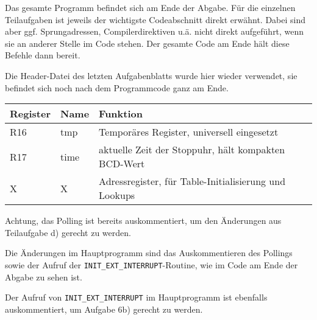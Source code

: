 \documentclass{CInf_practice}
\begin{document}
\cinftitle

Das gesamte Programm befindet sich am Ende der Abgabe.
Für die einzelnen Teilaufgaben ist jeweils der wichtigste Codeabschnitt
direkt erwähnt. Dabei sind aber ggf. Sprungadressen, Compilerdirektiven u.ä.
nicht direkt aufgeführt, wenn sie an anderer Stelle im Code stehen. Der gesamte
Code am Ende hält diese Befehle dann bereit.

Die Header-Datei des letzten Aufgabenblatts wurde hier wieder verwendet, sie 
befindet sich noch nach dem Programmcode ganz am Ende.



\begin{tabular}{l|l|l}
\bf Register & \bf Name & \bf Funktion \\\hline
R16 & tmp & Temporäres Register, universell eingesetzt \\
R17 & time & aktuelle Zeit der Stoppuhr, hält kompakten BCD-Wert \\
X & X & Adressregister, für Table-Initialisierung und Lookups
\end{tabular}











Achtung, das Polling ist bereits auskommentiert, um den Änderungen aus 
Teilaufgabe d) gerecht zu werden.







Die Änderungen im Hauptprogramm sind das Auskommentieren des Pollings sowie
der Aufruf der \texttt{INIT\_EXT\_INTERRUPT}-Routine, wie im Code am Ende der 
Abgabe zu sehen ist.

Der Aufruf von \texttt{INIT\_EXT\_INTERRUPT} im Hauptprogramm ist ebenfalls 
auskommentiert, um Aufgabe 6b) gerecht zu werden.
\end{document}
